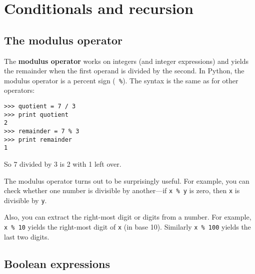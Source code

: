 

\chapter{Conditionals and recursion}

\section{The modulus operator}

The {\bf modulus operator} works on integers (and integer expressions)
and yields the remainder when the first operand is divided by the
second.  In Python, the modulus operator is a percent sign ({\tt
\%}).  The syntax is the same as for other operators:

\beforeverb
\begin{verbatim}
>>> quotient = 7 / 3
>>> print quotient
2
>>> remainder = 7 % 3
>>> print remainder
1
\end{verbatim}
\afterverb
%
So 7 divided by 3 is 2 with 1 left over.

The modulus operator turns out to be surprisingly useful.  For
example, you can check whether one number is divisible by another---if
{\tt x \% y} is zero, then {\tt x} is divisible by {\tt y}.

Also, you can extract the right-most digit
or digits from a number.  For example, {\tt x \% 10} yields the
right-most digit of {\tt x} (in base 10).  Similarly {\tt x \% 100}
yields the last two digits.


\section{Boolean expressions}


